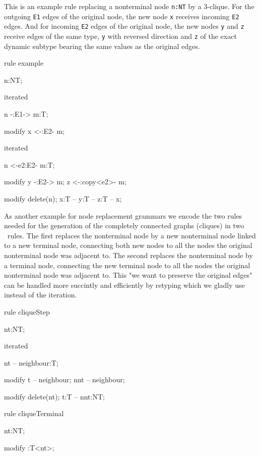   \begin{example}
This is an example rule replacing a nonterminal node \texttt{n:NT} by a 3-clique.
For the outgoing \texttt{E1} edges of the original node, the new node \texttt{x} receives incoming \texttt{E2} edges.
And for incoming \texttt{E2} edges of the original node, the new nodes \texttt{y} and \texttt{z} receive edges of the same type, \texttt{y} with reversed direction and \texttt{z} of the exact dynamic subtype bearing the same values as the original edges.
    \begin{grgen}
rule example
{
  n:NT;

  iterated {
    n -:E1-> m:T;

    modify {
      x <-:E2- m;
    }
  }

  iterated {
    n <-e2:E2- m:T;   	

    modify {
      y -:E2-> m;
      z <-:copy<e2>- m;      
    }
  }
  
  modify {
    delete(n);
    x:T -- y:T -- z:T -- x; 
  }
}
    \end{grgen}
  \end{example}

As another example for node replacement grammars we encode the two rules needed for the generation of the completely connected graphs (cliques) in two \GrG~rules. The first replaces the nonterminal node by a new nonterminal node linked to a new terminal node, connecting both new nodes to all the nodes the original nonterminal node was adjacent to. The second replaces the nonterminal node by a terminal node, connecting the new terminal node to all the nodes the original nonterminal node was adjacent to. This "we want to preserve the original edges" can be handled more succintly and efficiently by retyping which we gladly use instead of the iteration.

  \begin{example}
    \begin{grgen}
rule cliqueStep
{
  nt:NT;
  
  iterated {
    nt -- neighbour:T;

    modify {
      t -- neighbour;
      nnt -- neighbour;
    }
  }
  
  modify {
    delete(nt);
    t:T -- nnt:NT;
  }
}

rule cliqueTerminal
{
  nt:NT;
  
  modify {
    :T<nt>;
  }
}
    \end{grgen}
  \end{example}

